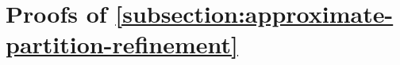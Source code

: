 %	

\section{Proofs of \cref{subsection:approximate-partition-refinement}}\label{appendix: approximate-partition-refinement}

